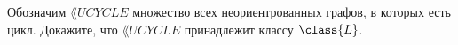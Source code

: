Обозначим $\lang{UCYCLE}$ множество всех неориентрованных графов, в которых есть цикл. Докажите, что
$\lang{UCYCLE}$ принадлежит классу $\class{L}$.
